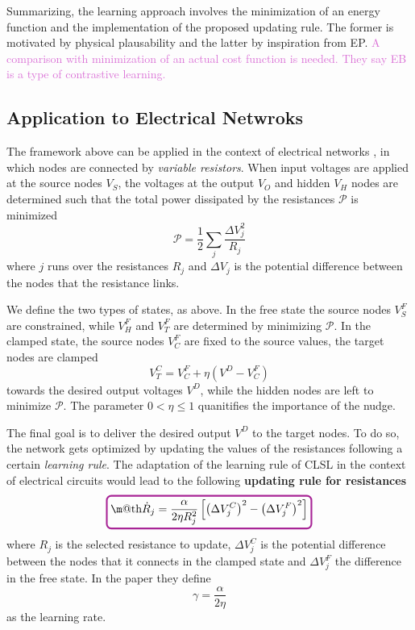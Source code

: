 \documentclass[11pt]{article}
\makeatletter
\newcommand*{\boxcolor}{Mulberry}
\renewcommand{\boxed}[1]{\textcolor{\boxcolor}{%
    \tikz[baseline={([yshift=-1ex]current bounding box.center)}] \node[rectangle, minimum width=1ex,rounded corners,draw, line width=1.5pt] {\normalcolor\m@th$\displaystyle#1$};}}
\newcommand{\res}[1]{\textcolor{Mulberry}{\bf{#1}}}
\makeatother
\begin{document}
Summarizing, the learning approach involves the minimization of an energy function and the implementation of the proposed updating rule. The former is motivated by physical plausability and the latter by inspiration from EP. \textcolor{Orchid}{A comparison with minimization of an actual cost function is needed. They say EB is a type of contrastive learning.}

\subsection{Application to Electrical Netwroks}

The framework above can be applied in the context of electrical networks \cite{Dillavou}, in which nodes are connected by \textit{variable resistors}. When input voltages are applied at the source nodes $V_{S}$, the voltages at the output $V_{O}$ and hidden $V_{H}$ nodes are determined such that the total power dissipated by the resistances $\mathcal{P}$ is minimized
\[
\mathcal{P}  = \frac{1}{2} \sum_{j} \frac{\Delta V_j^2}{R_j}   
\]
where $j$ runs over the resistances $R_j$ and $\Delta V_j$ is the potential difference between the nodes that the resistance links.

We define the two types of states, as above. In the free state the source nodes $V^{F}_{S}$ are constrained, while $V^{F}_{H}$ and $V^{F}_{T}$ are determined by minimizing $\mathcal{P}$. In the clamped state, the source nodes $V^{F}_{C}$ are fixed to the source values, the target nodes are clamped 
\[
V^{C}_{T} = V^{F}_{C} + \eta \left( V^{D} - V^{F}_{C} \right)   
\] 
towards the desired output voltages $V^D$, while the hidden nodes are left to minimize $\mathcal{P}$. The parameter $0 < \eta \le 1$ quanitifies the importance of the nudge.

The final goal is to deliver the desired output $V^{D}$ to the target nodes. To do so, the network gets optimized by updating the values of the resistances following a certain \textit{learning rule}. The adaptation of the learning rule of CLSL in the context of electrical circuits would lead to the following \res{updating rule for resistances}
\begin{equation}
\boxed{\dot{R}_j = \frac{\alpha}{2\eta R_{j}^2} \left[ \left( \Delta V_{j}^{C}\right)^2 - \left( \Delta V_{j}^{F}\right)^2 \right] }
\label{eq:cont_rul_res}   
\end{equation}
where $R_{j}$ is the selected resistance to update, $\Delta V_{j}^{C}$ is the potential difference between the nodes that it connects in the clamped state and $\Delta V_{j}^{F}$ the difference in the free state. In the paper \cite{Dillavou} they define
\[
\gamma = \frac{\alpha}{2\eta}
\]
as the learning rate.
\end{document}
